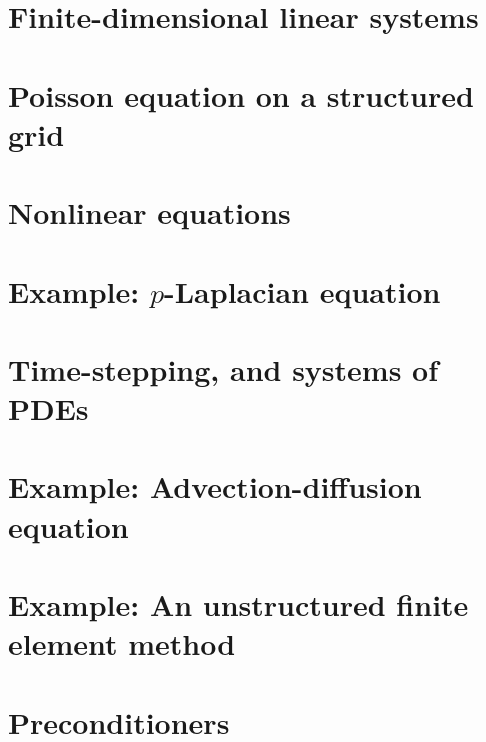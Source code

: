 \documentclass{tufte-book}
\newcommand{\CODELOC}{}  %
\newcommand{\stubinput}[2]{}
\newcommand{\stubinput}[2]{\vspace{5cm} \centerline{\LARGE Percent completed:  \Huge #2\%.} \vfill}
\theoremstyle{definition}
\begin{document}
\chapter{Finite-dimensional linear systems}
\label{chap:ls}
\renewcommand{\CODELOC}{ch2/}


\chapter{Poisson equation on a structured grid}
\label{chap:st}
\renewcommand{\CODELOC}{ch3/}


\chapter{Nonlinear equations}
\label{chap:nl}
\renewcommand{\CODELOC}{ch4/}


\chapter{Example: $p$-Laplacian equation}
\label{chap:of}
\renewcommand{\CODELOC}{ch5/}


\chapter{Time-stepping, and systems of PDEs}
\label{chap:ts}
\renewcommand{\CODELOC}{ch6/}


\chapter{Example: Advection-diffusion equation}
\label{chap:ad}
\renewcommand{\CODELOC}{ch7/}


\chapter{Example: An unstructured finite element method}
\label{chap:un}
\renewcommand{\CODELOC}{ch8/}


\chapter{Preconditioners}
\label{chap:pr}
\renewcommand{\CODELOC}{ch9/}

\end{document}
